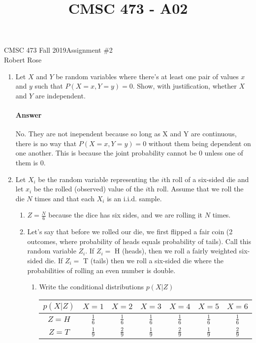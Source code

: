 \documentclass[12pt]{article}
\title{CMSC 473 - A02}
\begin{document}
CMSC 473 Fall 2019\hfill Assignment \#2\\
Robert Rose

\hrulefill

\begin{enumerate}
\item Let $X$ and $Y$ be random variables where there's at least one pair of values $x$ and $y$
      such that $P(X = x, Y = y) = 0$. Show, with justification, whether $X$ and $Y$ are independent.
    \paragraph{Answer} No. They are not inependent because so long as X and Y are continuous,
                there is no way that $P(X = x, Y = y) = 0$ without them being dependent on
                one another. This is because the joint probability cannot be 0 unless one
                of them is 0.
\item Let $X_i$ be the random variable representing the $i$th roll of a six-sided die
      and let $x_i$ be the rolled (observed) value of the $i$th roll. Assume that we
      roll the die $N$ times and that each $X_i$ is an i.i.d. sample.
  \begin{enumerate}
  \item $Z = \frac{N}{6}$ because the dice has six sides, and we are rolling it $N$ times.
  \item Let's say that before we rolled our die, we first flipped a fair coin (2 outcomes, where
        probability of heads equals probability of tails). Call this random variable $Z_i$. 
        If $Z_i =$ H (heads), then we roll a fairly weighted six-sided die. If $Z_i =$ T (tails)
        then we roll a six-sided die where the probabilities of rolling an even number is
        double.
        \begin{enumerate}
            \item Write the conditional distributions $p(X|Z)$
                \begin{center}
                \begin{tabular}{ |c|c|c|c|c|c|c| }
                    \hline
                    $p(X|Z)$ & $X = 1$ & $X = 2$ & $X = 3$ & $X = 4$ & $X = 5$ & $X = 6$ \\
                    \hline
                    $Z = H$ & $\frac{1}{6}$ & $\frac{1}{6}$ & $\frac{1}{6}$ & $\frac{1}{6}$ & $\frac{1}{6}$ & $\frac{1}{6}$ \\
                    \hline
                    $Z = T$ & $\frac{1}{9}$ & $\frac{2}{9}$ & $\frac{1}{9}$ & $\frac{2}{9}$ & $\frac{1}{9}$ & $\frac{2}{9}$ \\

\end{tabular}
\end{center}
\end{enumerate}
\end{enumerate}
\end{enumerate}
\end{document}
